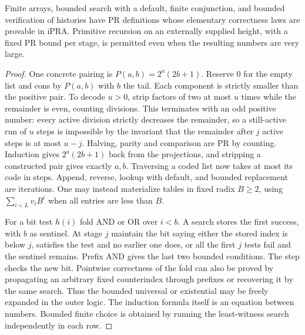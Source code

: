 \begin{lemma}\label{lem:toolkit}
Finite arrays, bounded search with a default, finite conjunction, and bounded verification of histories have PR definitions whose elementary correctness laws are provable in iPRA. Primitive recursion on an externally supplied height, with a fixed PR bound per stage, is permitted even when the resulting numbers are very large.
\end{lemma}
\begin{proof}
One concrete pairing is $P(a,b)=2^a(2b+1)$. Reserve $0$ for the empty list and cons by $P(a,b)$ with $b$ the tail. Each component is strictly smaller than the positive pair. To decode $u>0$, strip factors of two at most $u$ times while the remainder is even, counting divisions. This terminates with an odd positive number: every active division strictly decreases the remainder, so a still-active run of $u$ steps is impossible by the invariant that the remainder after $j$ active steps is at most $u-j$. Halving, parity and comparison are PR by counting. Induction gives $2^a(2b+1)$ back from the projections, and stripping a constructed pair gives exactly $a,b$. Traversing a coded list now takes at most its code in steps. Append, reverse, lookup with default, and bounded replacement are iterations. One may instead materialize tables in fixed radix $B\ge2$, using $\sum_{i<L}v_i B^i$ when all entries are less than $B$.
 
For a bit test $h(i)$ fold AND or OR over $i<b$. A search stores the first success, with $b$ as sentinel. At stage $j$ maintain the bit saying either the stored index is below $j$, satisfies the test and no earlier one does, or all the first $j$ tests fail and the sentinel remains. Prefix AND gives the last two bounded conditions. The step checks the new bit. Pointwise correctness of the fold can also be proved by propagating an arbitrary fixed counterindex through prefixes or recovering it by the same search. Thus the bounded universal or existential may be freely expanded in the outer logic. The induction formula itself is an equation between numbers. Bounded finite choice is obtained by running the least-witness search independently in each row.


\end{proof}
